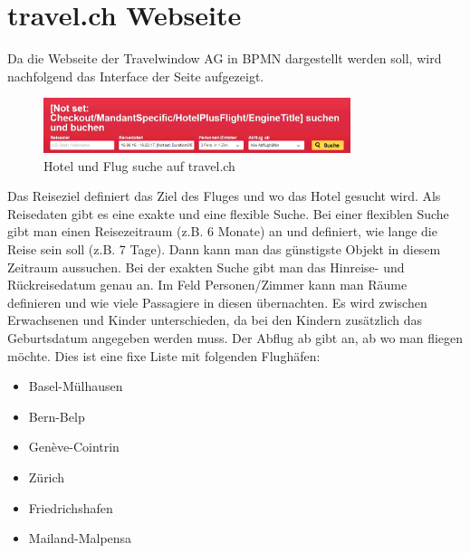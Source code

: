 \section{travel.ch Webseite}
Da die Webseite der Travelwindow AG in BPMN dargestellt werden soll, wird nachfolgend das Interface der Seite aufgezeigt.
\begin{figure}[H]
	\centering
	\includegraphics[width=0.8\textwidth]{images/travel-search.png}
	\caption{Hotel und Flug suche auf travel.ch}
	\label{fig:recherche:travelch:search}
\end{figure}
Das Reiseziel definiert das Ziel des Fluges und wo das Hotel gesucht wird. Als Reisedaten gibt es eine exakte und eine flexible Suche. Bei einer flexiblen Suche gibt man einen Reisezeitraum (z.B. 6 Monate) an und definiert, wie lange die Reise sein soll (z.B. 7 Tage). Dann kann man das günstigste Objekt in diesem Zeitraum aussuchen. Bei der exakten Suche gibt man das Hinreise- und Rückreisedatum genau an.
Im Feld Personen/Zimmer kann man Räume definieren und wie viele Passagiere in diesen übernachten. Es wird zwischen Erwachsenen und Kinder unterschieden, da bei den Kindern zusätzlich das Geburtsdatum angegeben werden muss. Der Abflug ab gibt an, ab wo man fliegen möchte. Dies ist eine fixe Liste mit folgenden Flughäfen:
\begin{itemize}
\item Basel-Mülhausen
\item Bern-Belp
\item Genève-Cointrin
\item Zürich
\item Friedrichshafen
\item Mailand-Malpensa
\end{itemize}

